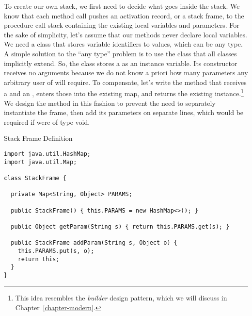 
To create our own stack, we first need to decide what goes inside the stack. We know that each method call pushes an activation record, or a stack frame, to the procedure call stack containing the existing local variables and parameters. For the sake of simplicity, let's assume that our methods never declare local variables. We need a class that stores variable identifiers to values, which can be any type. A simple solution to the ``any type'' problem is to use the  class that all classes implicitly extend. So, the  class stores a  as an instance variable. Its constructor receives no arguments because we do not know a priori how many parameters any arbitrary user of  will require. To compensate, let's write the  method that receives a  and an , enters those into the existing map, and returns the existing instance.\footnote{This idea resembles the \textit{builder} design pattern, which we will discuss in Chapter~\ref{chapter-modern}.} We design the method in this fashion to prevent the need to separately instantiate the frame, then add its parameters on separate lines, which would be required if  were of type void.

\begin{cl}{Stack Frame Definition}
\begin{lstlisting}[language=MyJava]
import java.util.HashMap;
import java.util.Map;

class StackFrame {

  private Map<String, Object> PARAMS;

  public StackFrame() { this.PARAMS = new HashMap<>(); }

  public Object getParam(String s) { return this.PARAMS.get(s); }

  public StackFrame addParam(String s, Object o) {
    this.PARAMS.put(s, o);
    return this;
  }
}
\end{lstlisting}
\end{cl}

